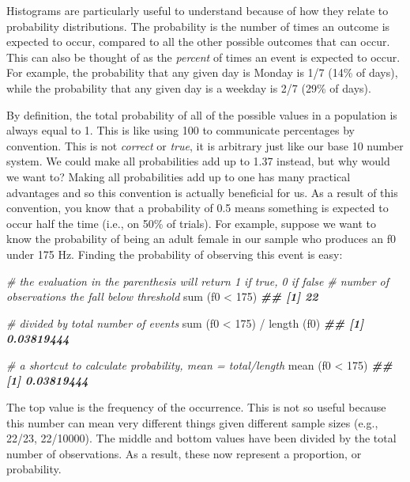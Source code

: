 \documentclass[
]{book}
\newenvironment{Shaded}{\begin{snugshade}}{\end{snugshade}}
\newcommand{\CommentTok}[1]{\textcolor[rgb]{0.56,0.35,0.01}{\textit{#1}}}
\newcommand{\DecValTok}[1]{\textcolor[rgb]{0.00,0.00,0.81}{#1}}
\newcommand{\DocumentationTok}[1]{\textcolor[rgb]{0.56,0.35,0.01}{\textbf{\textit{#1}}}}
\newcommand{\FunctionTok}[1]{\textcolor[rgb]{0.00,0.00,0.00}{#1}}
\newcommand{\NormalTok}[1]{#1}
\newcommand{\SpecialCharTok}[1]{\textcolor[rgb]{0.00,0.00,0.00}{#1}}
\begin{document}
Histograms are particularly useful to understand because of how they relate to probability distributions. The probability is the number of times an outcome is expected to occur, compared to all the other possible outcomes that can occur. This can also be thought of as the \emph{percent} of times an event is expected to occur. For example, the probability that any given day is Monday is 1/7 (14\% of days), while the probability that any given day is a weekday is 2/7 (29\% of days).

By definition, the total probability of all of the possible values in a population is always equal to 1. This is like using 100 to communicate percentages by convention. This is not \emph{correct} or \emph{true}, it is arbitrary just like our base 10 number system. We could make all probabilities add up to 1.37 instead, but why would we want to? Making all probabilities add up to one has many practical advantages and so this convention is actually beneficial for us. As a result of this convention, you know that a probability of 0.5 means something is expected to occur half the time (i.e., on 50\% of trials). For example, suppose we want to know the probability of being an adult female in our sample who produces an f0 under 175 Hz. Finding the probability of observing this event is easy:

\begin{Shaded}
\begin{Highlighting}[]
\CommentTok{\# the evaluation in the parenthesis will return 1 if true, 0 if false}
\CommentTok{\# number of observations the fall below threshold}
\FunctionTok{sum}\NormalTok{ (f0 }\SpecialCharTok{\textless{}} \DecValTok{175}\NormalTok{)  }
\DocumentationTok{\#\# [1] 22}

\CommentTok{\# divided by total number of events}
\FunctionTok{sum}\NormalTok{ (f0 }\SpecialCharTok{\textless{}} \DecValTok{175}\NormalTok{) }\SpecialCharTok{/} \FunctionTok{length}\NormalTok{ (f0)  }
\DocumentationTok{\#\# [1] 0.03819444}

\CommentTok{\# a shortcut to calculate probability, mean = total/length}
\FunctionTok{mean}\NormalTok{ (f0 }\SpecialCharTok{\textless{}} \DecValTok{175}\NormalTok{)}
\DocumentationTok{\#\# [1] 0.03819444}
\end{Highlighting}
\end{Shaded}

The top value is the frequency of the occurrence. This is not so useful because this number can mean very different things given different sample sizes (e.g., 22/23, 22/10000). The middle and bottom values have been divided by the total number of observations. As a result, these now represent a proportion, or probability.
\end{document}
